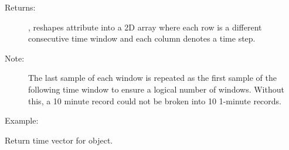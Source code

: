 \documentclass[letterpaper,10pt,english,openany,oneside]{sphinxmanual}
\begin{document}
\begin{fulllineitems}
\begin{fulllineitems}
\begin{description}
\begin{description}
\end{description}

\item[{Returns:}] \leavevmode
{}, reshapes attribute  into a 2D array 
where each row is a different consecutive time window and 
each column denotes a time step.

\item[{Note:}] \leavevmode
The last sample of each window is repeated as the first
sample of the following time window to ensure a logical
number of windows. Without this, a 10 minute record could
not be broken into 10 1-minute records.

\item[{Example:}] \leavevmode
\begin{sphinxVerbatim}[commandchars=\\\{\}]
   
   
  \PYG{p}{[}\PYG{p}{]}
    
\PYG{g+go}{array([[0, 1, 2],}
\PYG{g+go}{    [6, 7, 8]])}
\end{sphinxVerbatim}

\end{description}

\end{fulllineitems}


\begin{fulllineitems}
\label{\detokenize{index:sigpropy.TimeSeries.time}}
Return time vector for  object.


\end{fulllineitems}
\end{fulllineitems}
\end{document}
